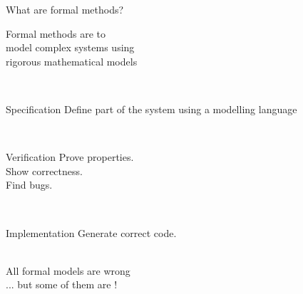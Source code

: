 \documentclass[aspectratio=169]{beamer}
\begin{document}
\begin{slide}{What are formal methods?}
  \centering

  \begin{minipage}{0.7\textwidth}
  \Large
  \begin{block}{}
    \centering
    Formal methods are  to
    \\
    model \alert{complex systems} using
    \\
    \alert{rigorous mathematical models}

  \end{block}
  \end{minipage}
  \\[10mm]

  \begin{minipage}{0.32\textwidth}
  \begin{alertblock}{Specification}
    Define part of the system using a modelling language
  \end{alertblock}
  \end{minipage}
~~
  \begin{minipage}{0.3\textwidth}
  \begin{alertblock}{Verification}
    Prove properties.\\Show correctness.\\Find bugs.
  \end{alertblock}
  \end{minipage}
~~
  \begin{minipage}{0.28\textwidth}
  \begin{exampleblock}{Implementation}
    Generate correct code.\\~\\
  \end{exampleblock}
  \end{minipage}

\end{slide}

\begin{frame}
  \huge\centering
  All formal models are \alert{wrong}
  \pause
  \\[5mm]
  ... but some of them are !
\end{frame}



\end{document}
